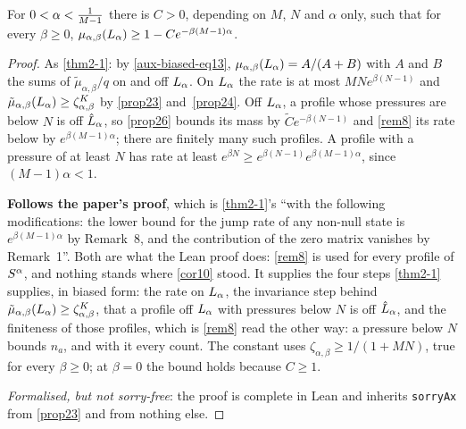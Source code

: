\begin{theorem}
  \label{thm27-1}
  \leanok
  For $0 < \alpha < \tfrac{1}{M-1}$ there is $C > 0$, depending on $M$, $N$ and
  $\alpha$ only, such that for every $\beta \ge 0$,
  $\mu_{\alpha,\beta}(L_\alpha) \ge 1 - C e^{-\beta(M-1)\alpha}$.
\end{theorem}
\begin{proof}
  \leanok
  As \ref{thm2-1}: by \ref{aux-biased-eq13}, $\mu_{\alpha,\beta}(L_\alpha)
  = A/(A+B)$ with $A$ and $B$ the sums of $\tilde{\mu}_{\alpha,\beta}/q$ on and
  off $L_\alpha$.  On $L_\alpha$ the rate is at most
  $MNe^{\beta(N-1)}$ and $\tilde{\mu}_{\alpha,\beta}(L_\alpha) \ge
  \zeta_{\alpha,\beta}^K$ by \ref{prop23} and~\ref{prop24}.  Off
  $L_\alpha$, a profile whose pressures are below $N$ is off
  $\hat{L}_\alpha$, so \ref{prop26} bounds its mass by $\tilde{C}
  e^{-\beta(N-1)}$ and \ref{rem8} its rate below by $e^{\beta(M-1)\alpha}$;
  there are finitely many such profiles.  A profile with a pressure of at least
  $N$ has rate at least $e^{\beta N} \ge e^{\beta(N-1)} e^{\beta(M-1)\alpha}$,
  since $(M-1)\alpha < 1$.

  \textbf{Follows the paper's proof}, which is \ref{thm2-1}'s ``with the
  following modifications: the lower bound for the jump rate of any non-null
  state is $e^{\beta(M-1)\alpha}$ by Remark~8, and the contribution of the zero
  matrix vanishes by Remark~1''.  Both are what the Lean proof does: \ref{rem8}
  is used for every profile of $S^\alpha$, and nothing stands where \ref{cor10}
  stood.  It supplies the four steps \ref{thm2-1} supplies, in biased form: the
  rate on $L_\alpha$, the invariance step behind
  $\tilde{\mu}_{\alpha,\beta}(L_\alpha) \ge \zeta_{\alpha,\beta}^K$, that a
  profile off $L_\alpha$ with pressures below $N$ is off $\hat{L}_\alpha$,
  and the finiteness of those profiles, which is \ref{rem8} read the other way:
  a pressure below $N$ bounds $n_a$, and with it every count.  The constant uses
  $\zeta_{\alpha,\beta} \ge 1/(1+MN)$, true for every $\beta \ge 0$; at $\beta =
  0$ the bound holds because $C \ge 1$.

  \emph{Formalised, but not sorry-free}: the proof is complete in Lean and
  inherits \texttt{sorryAx} from \ref{prop23} and from nothing else.
\end{proof}

